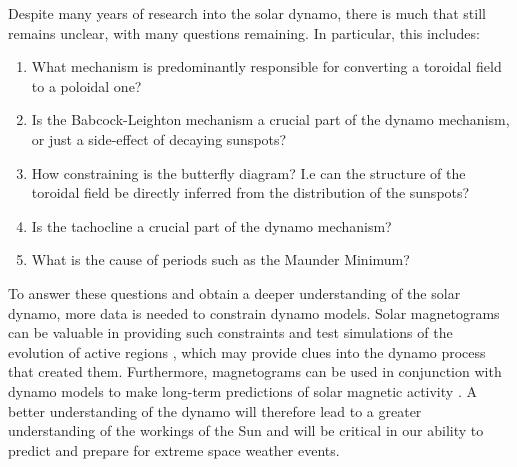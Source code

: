 \documentclass[11pt,a4paper,onecolumn]{report}
\begin{document}
Despite many years of research into the solar dynamo, there is much that still
remains unclear, with many questions remaining. In particular, this includes:
\begin{enumerate}
  \item What mechanism is predominantly responsible for converting a toroidal
  field to a poloidal one?

  \item Is the Babcock-Leighton mechanism a crucial part of the dynamo
  mechanism, or just a side-effect of decaying sunspots?

  \item How constraining is the butterfly diagram? I.e can the structure of the toroidal field be
  directly inferred from the distribution of the sunspots?

  \item Is the tachocline a crucial part of the dynamo mechanism?

  \item What is the cause of periods such as the Maunder Minimum?
\end{enumerate}
To answer these questions and obtain a deeper understanding of the solar dynamo,
more data is needed to constrain dynamo models. Solar magnetograms can be
valuable in providing such constraints
\citep{hagenaar_properties_2003,zhang_new_2010} and test simulations of the
evolution of active regions \citep{valori_nonlinear_2011}, which may provide
clues into the dynamo process that created them. Furthermore, magnetograms can
be used in conjunction with dynamo models to make long-term predictions of solar
magnetic activity \citep{kitiashvili_long-term_2019}. A better understanding of
the dynamo will therefore lead to a greater understanding of the workings of the
Sun and will be critical in our ability to predict and prepare for extreme space
weather events.






\end{document}
